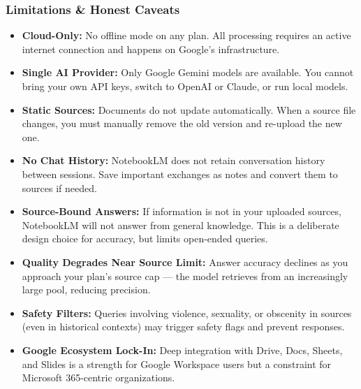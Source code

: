 \begin{frame}[fragile]\frametitle{Limitations \& Honest Caveats}
  \begin{itemize}
    \item \textbf{Cloud-Only:} No offline mode on any plan. All processing requires an active internet connection and happens on Google's infrastructure.
    \item \textbf{Single AI Provider:} Only Google Gemini models are available. You cannot bring your own API keys, switch to OpenAI or Claude, or run local models.
    \item \textbf{Static Sources:} Documents do not update automatically. When a source file changes, you must manually remove the old version and re-upload the new one.
    \item \textbf{No Chat History:} NotebookLM does not retain conversation history between sessions. Save important exchanges as notes and convert them to sources if needed.
    \item \textbf{Source-Bound Answers:} If information is not in your uploaded sources, NotebookLM will not answer from general knowledge. This is a deliberate design choice for accuracy, but limits open-ended queries.
    \item \textbf{Quality Degrades Near Source Limit:} Answer accuracy declines as you approach your plan's source cap — the model retrieves from an increasingly large pool, reducing precision.
    \item \textbf{Safety Filters:} Queries involving violence, sexuality, or obscenity in sources (even in historical contexts) may trigger safety flags and prevent responses.
    \item \textbf{Google Ecosystem Lock-In:} Deep integration with Drive, Docs, Sheets, and Slides is a strength for Google Workspace users but a constraint for Microsoft 365-centric organizations.
  \end{itemize}
\end{frame}

